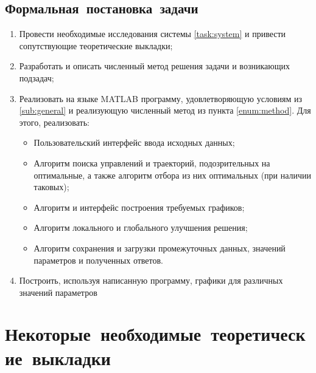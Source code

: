 \documentclass[11pt, oneside, final]{article}
\theoremstyle{break}
\numberwithin{equation}{section}
\theoremstyle{plain}
\theoremstyle{definition}
\begin{document}
    \subsection{Формальная~постановка~задачи} 
    \label{sub:formal}
    \begin{enumerate}
        \item Провести необходимые исследования системы \eqref{task:system} и привести сопутствующие теоретические выкладки;
        \item \label{enum:method} Разработать и описать численный метод решения задачи и возникающих подзадач;
        \item Реализовать на языке MATLAB программу, удовлетворяющую условиям из \ref{sub:general} и реализующую численный метод из пункта \ref{enum:method}.
        Для этого, реализовать:
        \begin{itemize}
            \item  Пользовательский интерфейс ввода исходных данных;
            \item  Алгоритм поиска управлений и траекторий, подозрительных на оптимальные, а также алгоритм отбора из них оптимальных (при наличии таковых);
            \item  Алгоритм и интерфейс построения требуемых графиков;
            \item  Алгоритм локального и глобального улучшения решения; 
            \item  Алгоритм сохранения и загрузки промежуточных данных, значений параметров и полученных ответов.
        \end{itemize}
        \item Построить, используя написанную программу, графики для различных значений параметров
    \end{enumerate}
    \pagebreak
    \section{Некоторые~необходимые~теоретические~выкладки}
    \label{sec:theory}
\end{document}

